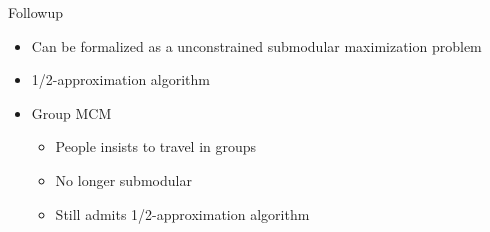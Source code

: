 \begin{frame}{Followup}
\begin{itemize}
	\item Can be formalized as a unconstrained submodular maximization problem
	\item 1/2-approximation algorithm
	\item Group MCM
  	\begin{itemize}
    	\item People insists to travel in groups
    	\item No longer submodular
    	\item Still admits 1/2-approximation algorithm 
	\end{itemize}   
\end{itemize}
\end{frame}